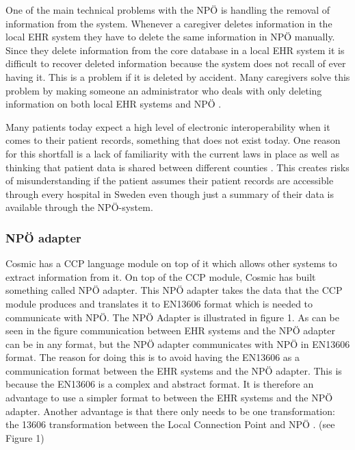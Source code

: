 \documentclass[14pt]{article}
\begin{document}
One of the main technical problems with the NPÖ is handling the removal of information from the system. Whenever a caregiver deletes information in the local \gls{EHR} system they have to delete the same information in NPÖ manually. Since they delete information from the core database in a local \gls{EHR} system it is difficult to recover deleted information because the system does not recall of ever having it. This is a problem if it is deleted by accident. Many caregivers solve this problem by making someone an administrator who deals with only deleting information on both local \gls{EHR} systems and NPÖ  \cite{ViktorJernelov}.

Many patients today expect a high level of electronic \gls{interoperability} when it comes to their patient records\cite{EPJ2}, something that does not exist today. One reason for this shortfall is a lack of familiarity with the current laws in place as well as thinking that patient data is shared between different counties \cite{EPJ2}. This creates risks of misunderstanding if the patient assumes their patient records are accessible through every hospital in Sweden even though just a summary of their data is available through the NPÖ-system.

\subsubsection{NPÖ adapter}


Cosmic has a CCP language module on top of it which allows other systems to extract information from it. On top of the CCP module, Cosmic has built something called NPÖ adapter. This NPÖ adapter takes the data that the CCP module produces and translates it to \gls{EN13606} format which is needed to communicate with NPÖ. The NPÖ Adapter is illustrated in figure 1. As can be seen in the figure communication between \gls{EHR} systems and the NPÖ adapter can be in any format, but the NPÖ adapter communicates with NPÖ in \gls{EN13606} format. The reason for doing this is to avoid having the \gls{EN13606} as a communication format between the \gls{EHR} systems and the NPÖ adapter. This is because the \gls{EN13606} is a complex and abstract format. It is therefore an advantage to use a simpler format to between the \gls{EHR} systems and the NPÖ adapter. Another advantage is that there only needs to be one transformation: the 13606 transformation between the Local Connection Point and NPÖ  \cite{ViktorJernelov}. (see Figure 1) 
\end{document}
